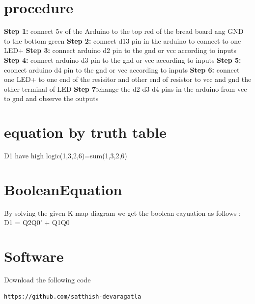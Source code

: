 \documentclass[10pt, a4paper]{article}
\begin{document}
\section{procedure}
\textbf{Step 1:} connect 5v of the Arduino to the top red of the bread board ang GND to the bottom green
\hfill \break
\textbf{Step 2:} connect d13 pin in the arduino to connect to one LED+
\hfill \break
\textbf{Step 3:} connect arduino d2 pin to the gnd or vcc according to inputs
\hfill \break
\textbf{Step 4:} connect arduino d3 pin to the gnd or vcc according to inputs
\hfill \break
\textbf{Step 5:} coonect arduino d4 pin to the gnd or vcc according to inputs
\hfill \break
\textbf{Step 6:} connect one LED+ to one end of the resisitor and other end of resistor to vcc and gnd the other terminal of LED
\hfill \break
\textbf{Step 7:}change the d2 d3 d4 pins in the arduino from vcc to gnd and observe the outputs
\hfill \break
\section{equation by truth table}
     
D1 have high logic(1,3,2,6)=sum(1,3,2,6)

\section{BooleanEquation}
By solving the given K-map diagram we get the boolean eayuation as follows : D1 = Q2Q0' + Q1Q0
\section{Software}
 Download the following code
 \begin{lstlisting}
https://github.com/satthish-devaragatla
 \end{lstlisting}
\end{document}
